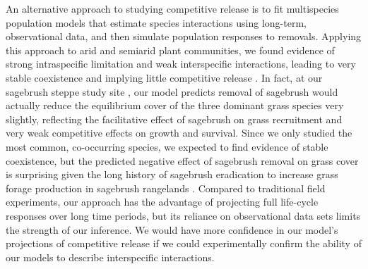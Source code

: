 \documentclass[11pt]{article}
\begin{document}
\begin{doublespacing}
An alternative approach to studying competitive release is to fit multispecies population models that estimate species interactions using long-term, observational data, and then simulate population responses to removals. Applying this approach to arid and semiarid plant communities, we found evidence of strong intraspecific limitation and weak interspecific interactions, leading to very stable coexistence and implying little competitive release \citep{adler_coexistence_2010,chu_large_2015}. In fact, at our sagebrush steppe study site  \citep{adler_coexistence_2010}, our model predicts removal of sagebrush would actually reduce the equilibrium cover of the three dominant grass species very slightly, reflecting the facilitative effect of sagebrush on grass recruitment and very weak competitive effects on growth and survival.  Since we only studied the most common, co-occurring species, we expected to find evidence of stable coexistence, but the predicted negative effect of sagebrush removal on grass cover is surprising given the long history of sagebrush eradication to increase grass forage production in sagebrush rangelands \citep{Cook1963, Mueggler1958, Robertson1947}.
Compared to traditional field experiments, our approach has the advantage of projecting full life-cycle responses over long time periods, but its reliance on observational data sets limits the strength of our inference. We would have more confidence in our model's projections of competitive release if we could experimentally confirm the ability of our models to describe interspecific interactions.


\end{doublespacing}
\end{document}
